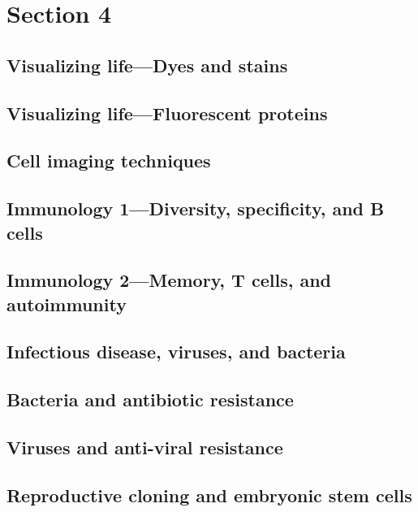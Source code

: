 \documentclass[../bio.tex]{subfiles}
\begin{document}
\chapter{Section 4}
\section{Visualizing life—Dyes and stains}
\section{Visualizing life—Fluorescent proteins}
\section{Cell imaging techniques}
\section{Immunology 1—Diversity, specificity, and B cells}
\section{Immunology 2—Memory, T cells, and autoimmunity}
\section{Infectious disease, viruses, and bacteria}
\section{Bacteria and antibiotic resistance}
\section{Viruses and anti-viral resistance}
\section{Reproductive cloning and embryonic stem cells}
\end{document}
